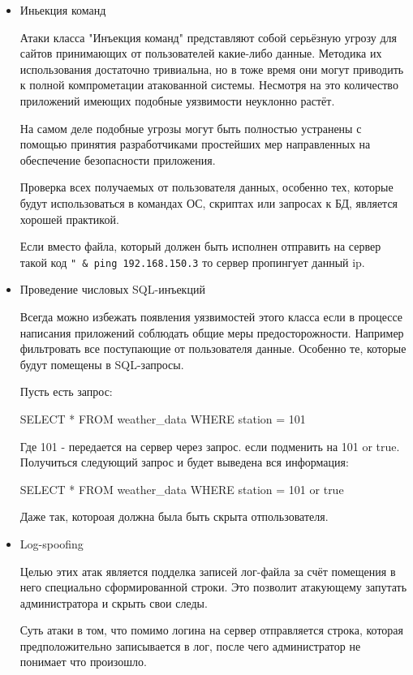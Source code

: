 \documentclass[11pt, a4paper]{article}		%
\begin{document}
\begin{itemize}

\item Иньекция команд

Атаки класса "Инъекция команд" представляют собой серьёзную угрозу для сайтов принимающих
от пользователей какие-либо данные. Методика их использования достаточно тривиальна, но в тоже
время они могут приводить к полной компрометации атакованной системы. Несмотря на это количество
приложений имеющих подобные уязвимости неуклонно растёт.

На самом деле подобные угрозы могут быть полностью устранены с помощью принятия разработчиками
простейших мер направленных на обеспечение безопасности приложения.

Проверка всех получаемых от пользователя данных, особенно тех, которые будут использоваться
в командах ОС, скриптах или запросах к БД, является хорошей практикой.

Если вместо файла, который должен быть исполнен отправить на сервер такой код \verb'" & ping 192.168.150.3' то сервер пропингует данный ip.

\item Проведение числовых SQL-инъекций

Всегда можно избежать появления уязвимостей этого класса
если в процессе написания приложений соблюдать общие меры предосторожности.
Например фильтровать все поступающие от пользователя данные. Особенно те, которые
будут помещены в SQL-запросы. 

Пусть есть запрос:

SELECT * FROM weather\_data WHERE station = 101

Где 101 - передается на сервер через запрос. если подменить на 101 or true. Получиться следующий запрос и будет выведена вся информация:

SELECT * FROM weather\_data WHERE station = 101 or true

Даже так, котороая должна была быть скрыта отпользователя.

\item Log-spoofing

Целью этих атак является подделка записей лог-файла за счёт помещения в него специально сформированной строки.
Это позволит атакующему запутать администратора и скрыть свои следы.

Суть атаки в том, что помимо логина на сервер отправляется строка, которая предположительно записывается в лог, после чего администратор не понимает что произошло.


\end{itemize}
\end{document}
